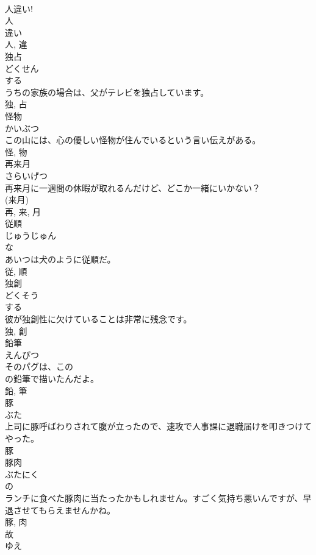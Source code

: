 \documentclass[8pt]{extreport}
\begin{document}
\begin{CJK}{UTF8}{min}
\\	人違い!	
\\	人 
\\	違い 
\\	人, 違	
\\	独占	
\\	どくせん	
\\	する 
\\	うちの家族の場合は、父がテレビを独占しています。	
\\	独, 占	
\\	怪物	
\\	かいぶつ	
\\	この山には、心の優しい怪物が住んでいるという言い伝えがある。	
\\	怪, 物	
\\	再来月	
\\	さらいげつ	
\\	再来月に一週間の休暇が取れるんだけど、どこか一緒にいかない？	
\\	(来月) 
\\	再, 来, 月	
\\	従順	
\\	じゅうじゅん	
\\	な 
\\	あいつは犬のように従順だ。	
\\	従, 順	
\\	独創	
\\	どくそう	
\\	する 
\\	彼が独創性に欠けていることは非常に残念です。	
\\	独, 創	
\\	鉛筆	
\\	えんぴつ	
\\	そのパグは、この
\\	の鉛筆で描いたんだよ。	
\\	鉛, 筆	
\\	豚	
\\	ぶた	
\\	上司に豚呼ばわりされて腹が立ったので、速攻で人事課に退職届けを叩きつけてやった。	
\\	豚	
\\	豚肉	
\\	ぶたにく	
\\	の 
\\	ランチに食べた豚肉に当たったかもしれません。すごく気持ち悪いんですが、早退させてもらえませんかね。	
\\	豚, 肉	
\\	故	
\\	ゆえ	

\end{CJK}
\end{document}
